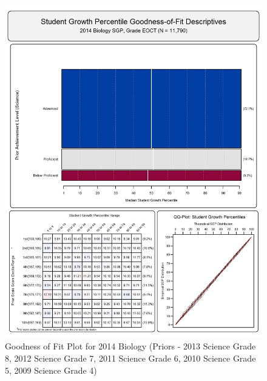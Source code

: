 \documentclass[12pt]{article}
\begin{document}
\begin{figure}[htbp]
\centering
\includegraphics{../img/Goodness_of_Fit/BIOLOGY.2014/2014_BIOLOGY_EOCT;2013_SCIENCE_8;2012_SCIENCE_7;2011_SCIENCE_6;2010_SCIENCE_5;2009_SCIENCE_4.png}
\caption{Goodness of Fit Plot for 2014 Biology (Priors - 2013 Science
Grade 8, 2012 Science Grade 7, 2011 Science Grade 6, 2010 Science Grade
5, 2009 Science Grade 4)}
\end{figure}
\end{document}
